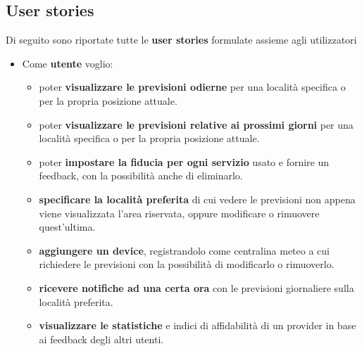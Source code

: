         \subsection{User stories}
        Di seguito sono riportate tutte le \textbf{user stories} formulate assieme agli utilizzatori
        \begin{itemize}
            \item Come \textbf{utente}
            voglio:
            \begin{itemize}
                \item poter \textbf{visualizzare le previsioni odierne} per una località specifica o per la propria posizione attuale.
                \item poter \textbf{visualizzare le previsioni relative ai prossimi giorni} per una località specifica o per la propria posizione attuale.
                \item poter \textbf{impostare la fiducia per ogni servizio} usato e fornire un feedback, con la possibilità anche di eliminarlo.
                \item \textbf{specificare la località preferita} di cui vedere le previsioni non appena viene visualizzata l'area riservata, oppure modificare o rimuovere quest'ultima.
                \item \textbf{aggiungere un device}, registrandolo come centralina meteo a cui richiedere le previsioni con la possibilità di modificarlo o rimuoverlo.
                \item \textbf{ricevere notifiche ad una certa ora} con le previsioni giornaliere sulla località preferita.
                \item \textbf{visualizzare le statistiche} e indici di affidabilità di un provider in base ai feedback degli altri utenti.
                
            \end{itemize}
        \end{itemize}
            
	    
